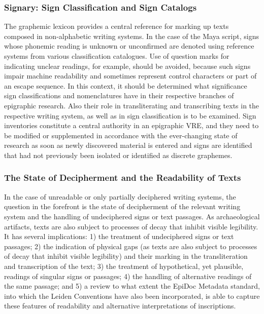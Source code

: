 \documentclass[amsthm,ebook]{saparticle}
\begin{document}
\subsubsection[Signary: Sign Classification and Sign Catalogs ]{Signary: Sign Classification and Sign Catalogs }
\noindent The graphemic lexicon provides a central reference for marking up texts composed in non-alphabetic writing systems. In
the case of the Maya script, signs whose phonemic reading is unknown or unconfirmed are denoted using reference systems
from various classification catalogues. 
Use of question marks for indicating unclear readings, for
example, should be avoided, because such signs impair machine readability and sometimes represent control characters or
part of an escape sequence. In this context, it should be determined what significance sign classifications and
nomenclatures have in their respective branches of epigraphic research. Also their role in transliterating and
transcribing texts in the respective writing system, as well as in sign classification is to be examined. Sign
inventories constitute a central authority in an epigraphic VRE, and they need to be modified or supplemented in
accordance with the ever-changing state of research as soon as newly discovered material is entered and signs are
identified that had not previously been isolated or identified as discrete graphemes. 

\subsubsection[The State of Decipherment and the Readability of Texts ]{The State of Decipherment
and the Readability of Texts }
\noindent In the case of unreadable or only partially deciphered writing systems, the question in the forefront is the state of
decipherment of the relevant writing system and the handling of undeciphered signs or text passages. As archaeological
artifacts, texts are also subject to processes of decay that inhibit visible legibility. It has several implications:
1) the treatment of undeciphered signs or text passages; 2) the indication of physical gaps (as texts are also subject
to processes of decay that inhibit visible legibility) and their marking in the transliteration and transcription of
the text; 3) the treatment of hypothetical, yet plausible, readings of singular signs or passages; 4) the handling of
alternative readings of the same passage; and 5) a review to what extent the EpiDoc Metadata standard, into which the
Leiden Conventions have also been incorporated, is able to capture these features of readability and alternative
interpretations of inscriptions.
\end{document}
